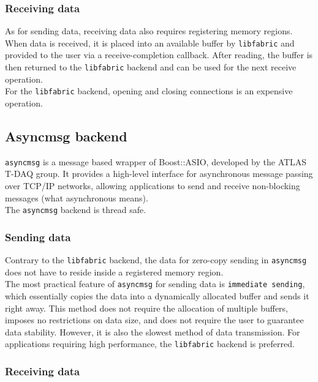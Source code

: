 \subsubsection{Receiving data}

As for sending data, receiving data also requires registering memory regions. When data is received, it is placed into an available buffer by \texttt{libfabric} and provided to the user via a receive-completion callback. After reading, the buffer is then returned to the \texttt{libfabric} backend and can be used for the next receive operation.\\
For the \texttt{libfabric} backend, opening and closing connections is an expensive operation.

\subsection{Asyncmsg backend}
\label{subsec:asyncmsg}

\texttt{asyncmsg} is a message based wrapper of Boost::ASIO, developed by the \acs{ATLAS} \acs{T-DAQ} group. It provides a high-level interface for asynchronous message passing over TCP/IP networks, allowing applications to send and receive non-blocking messages (what asynchronous means).\\
The \texttt{asyncmsg} backend is thread safe.

\subsubsection{Sending data}

Contrary to the \texttt{libfabric} backend, the data for zero-copy sending in \texttt{asyncmsg} does not have to reside inside a registered memory region.\\
The most practical feature of \texttt{asyncmsg} for sending data is \texttt{immediate sending}, which essentially copies the data into a dynamically allocated buffer and sends it right away. This method does not require the allocation of multiple buffers, imposes no restrictions on data size, and does not require the user to guarantee data stability. However, it is also the slowest method of data transmission. For applications requiring high performance, the \texttt{libfabric} backend is preferred.

\subsubsection{Receiving data}

